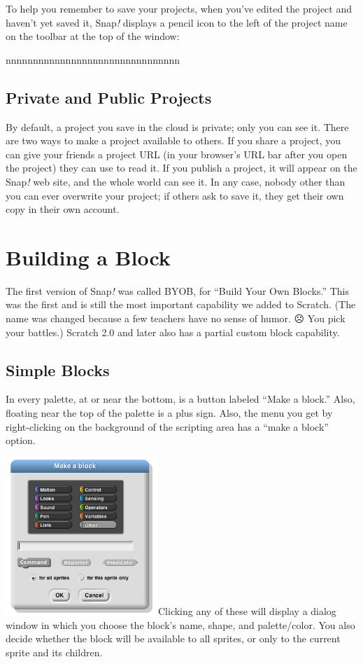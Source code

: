 To help you remember to save your projects, when you've edited the
project and haven't yet saved it, Snap\emph{!} displays a pencil icon to
the left of the project name on the toolbar at the top of the window:

nnnnnnnnnnnnnnnnnnnnnnnnnnnnnnnn

\subsection{Private and Public
Projects}\label{private-and-public-projects}

By default, a project you save in the cloud is private; only you can see
it. There are two ways to make a project available to others. If you
share a project, you can give your friends a project URL (in your
browser's URL bar after you open the project) they can use to read it.
If you publish a project, it will appear on the Snap\emph{!} web site,
and the whole world can see it. In any case, nobody other than you can
ever overwrite your project; if others ask to save it, they get their
own copy in their own account.

\section{\texorpdfstring{\hfill\break
Building a Block}{ Building a Block}}\label{building-a-block}

The first version of Snap\emph{!} was called BYOB, for ``Build Your Own
Blocks.'' This was the first and is still the most important capability
we added to Scratch. (The name was changed because a few teachers have
no sense of humor. ☹ You pick your battles.) Scratch 2.0 and later also
has a partial custom block capability.

\subsection{Simple Blocks}\label{simple-blocks}

In every palette, at or near the bottom, is a button labeled ``Make a
block.'' Also, floating near the top of the palette is a plus sign.
Also, the menu you get by right-clicking on the background of the
scripting area has a ``make a block'' option.

\includegraphics[width=2.27083in,height=2.34722in]{media/image501.png}Clicking
any of these will display a dialog window in which you choose the
block's name, shape, and palette/color. You also decide whether the
block will be available to all sprites, or only to the current sprite
and its children.

